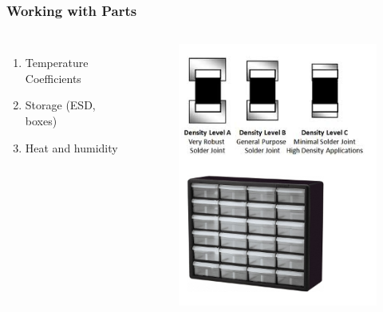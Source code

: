 \documentclass{beamer}
\begin{document}

\begin{frame}
\frametitle{Working with Parts}
\begin{columns}[c] %

\begin{enumerate}
\item Temperature Coefficients
\item Storage (ESD, boxes) 
\item Heat and humidity 
\end{enumerate}

\begin{figure}
\includegraphics[width=1.0\linewidth]{resistors.png}
\end{figure}

\end{columns}
\end{frame}
\end{document}
